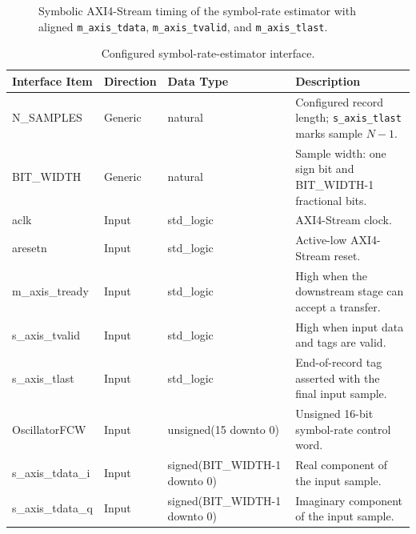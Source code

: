 \begin{figure}[H]
\begin{center}
\resizebox{0.96\textwidth}{!}{}
\caption[Symbol-rate-estimator AXI4-Stream timing.]{Symbolic AXI4-Stream timing of the symbol-rate estimator with aligned \texttt{m\_axis\_tdata}, \texttt{m\_axis\_tvalid}, and \texttt{m\_axis\_tlast}.}
\label{fig:symbol_rate_timing}
\end{center}
\end{figure}

\begin{table}[H]
\singlespacing
\small
\setlength{\tabcolsep}{2pt}
\renewcommand{\arraystretch}{0.95}
\begin{center}
\caption{Configured symbol-rate-estimator interface.}
\begin{tabularx}{\textwidth}{|L{0.24\textwidth}|L{0.13\textwidth}|L{0.28\textwidth}|Y|}
\hline
\textbf{Interface Item} & \textbf{Direction} & \textbf{Data Type} & \textbf{Description} \\
\hline
N\_SAMPLES         & Generic & natural & Configured record length; \texttt{s\_axis\_tlast} marks sample $N-1$. \\
\hline
BIT\_WIDTH         & Generic & natural & Sample width: one sign bit and BIT\_WIDTH-1 fractional bits. \\
\hline
aclk               & Input & std\_logic & AXI4-Stream clock. \\
\hline
aresetn            & Input & std\_logic & Active-low AXI4-Stream reset. \\
\hline
m\_axis\_tready    & Input & std\_logic & High when the downstream stage can accept a transfer. \\
\hline
s\_axis\_tvalid    & Input & std\_logic & High when input data and tags are valid. \\
\hline
s\_axis\_tlast     & Input & std\_logic & End-of-record tag asserted with the final input sample. \\
\hline
OscillatorFCW      & Input & unsigned(15 downto 0) & Unsigned 16-bit symbol-rate control word. \\
\hline
s\_axis\_tdata\_i  & Input & signed(BIT\_WIDTH-1 \newline downto 0) & Real component of the input sample. \\
\hline
s\_axis\_tdata\_q  & Input & signed(BIT\_WIDTH-1 \newline downto 0) & Imaginary component of the input sample. \\

\end{tabularx}
\end{center}
\end{table}
